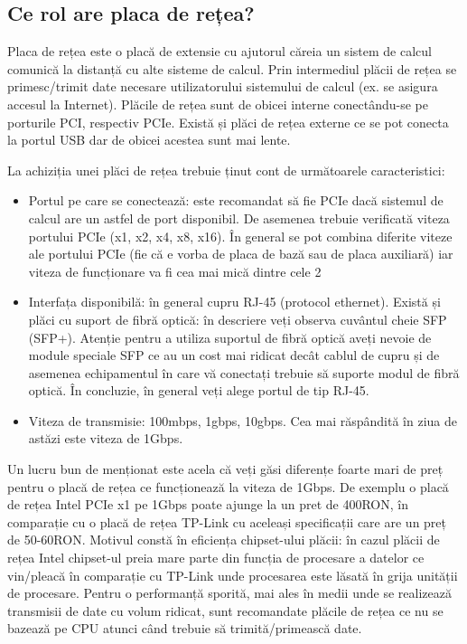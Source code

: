 
\subsection{Ce rol are placa de rețea?}
\label{sec:hardware-extensii-net}

Placa de rețea este o placă de extensie cu ajutorul căreia un sistem de calcul
comunică la distanță cu alte sisteme de calcul. Prin intermediul plăcii de rețea
se primesc/trimit date necesare utilizatorului sistemului de calcul (ex. se
asigura accesul la Internet). Plăcile de rețea sunt de obicei interne
conectându-se pe porturile PCI, respectiv PCIe. Există și plăci de rețea externe
ce se pot conecta la portul USB dar de obicei acestea sunt mai lente.


La achiziția unei plăci de rețea trebuie ținut cont de următoarele caracteristici:

\begin{itemize}
	\item Portul pe care se conectează: este recomandat să fie PCIe dacă
		sistemul de calcul are un astfel de port disponibil. De asemenea
		trebuie verificată viteza portului PCIe (x1, x2, x4, x8, x16).
		În general se pot combina diferite viteze ale portului PCIe (fie
		că e vorba de placa de bază sau de placa auxiliară) iar viteza
		de funcționare va fi cea mai mică dintre cele 2
	\item Interfața disponibilă: în general cupru RJ-45 (protocol ethernet).
		Există și plăci cu suport de fibră optică: în descriere veți
		observa cuvântul cheie SFP  (SFP+). Atenție pentru a utiliza suportul
		de fibră optică aveți nevoie de module speciale SFP ce au un
		cost mai ridicat decât cablul de cupru și de asemenea
		echipamentul în care vă conectați trebuie să suporte modul de
		fibră optică. În concluzie, în general veți alege portul de tip
		RJ-45.
	\item Viteza de transmisie: 100mbps, 1gbps, 10gbps. Cea mai răspândită
		în ziua de astăzi este viteza de 1Gbps.
\end{itemize}


Un lucru bun de menționat este acela că veți găsi diferențe foarte mari de preț
pentru o placă de rețea ce funcționează la viteza de 1Gbps. De exemplu o placă
de rețea Intel PCIe x1 pe 1Gbps poate ajunge la un pret de 400RON, în comparație
cu o placă de rețea TP-Link cu aceleași specificații care are un preț de
50-60RON. Motivul constă în eficiența chipset-ului plăcii: în cazul plăcii de
rețea Intel chipset-ul preia mare parte din funcția de procesare a datelor ce
vin/pleacă în comparație cu TP-Link unde procesarea este lăsată în grija
unității de procesare. Pentru o performanță sporită, mai ales în medii unde se
realizează transmisii de date cu volum ridicat, sunt recomandate plăcile de
rețea ce nu se bazează pe CPU atunci când trebuie să trimită/primească date.

